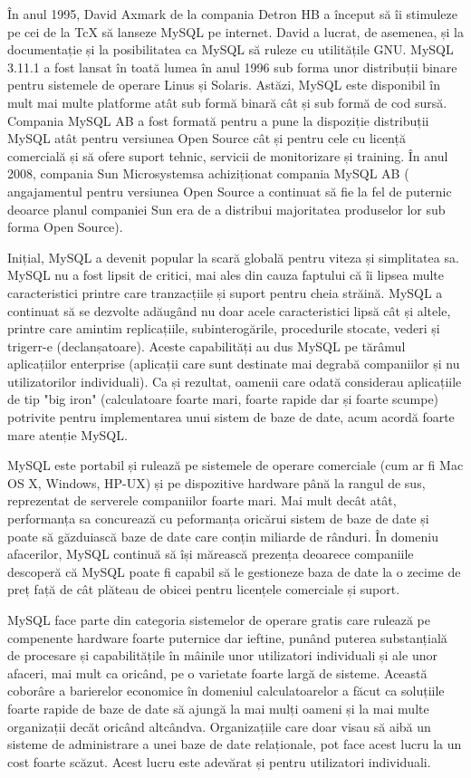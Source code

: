 \documentclass[12pt]{book}
\begin{document}
În anul 1995, David Axmark de la compania Detron HB a început să îi stimuleze pe cei de la TcX să lanseze MySQL pe internet. David a lucrat, de asemenea, și la documentație și la posibilitatea ca MySQL să ruleze cu utilitățile GNU. MySQL 3.11.1 a fost lansat în toată lumea în anul 1996 sub forma unor distribuții binare pentru sistemele de operare Linus și Solaris. Astăzi, MySQL este disponibil în mult mai multe platforme atât sub formă binară cât și sub formă de cod sursă. Compania MySQL AB a fost formată pentru a pune la dispoziție distribuții MySQL atât pentru versiunea Open Source cât și pentru cele cu licență comercială și să ofere suport tehnic, servicii de monitorizare și training. În anul 2008, compania Sun Microsystemsa achiziționat compania MySQL AB ( angajamentul pentru versiunea Open Source a continuat să fie la fel de puternic deoarce planul companiei Sun era de a distribui majoritatea produselor lor sub forma Open Source).

Inițial, MySQL a devenit popular la scară globală pentru viteza și simplitatea sa. MySQL nu a fost lipsit de critici, mai ales din cauza faptului că îi lipsea multe caracteristici printre care tranzacțiile și suport pentru cheia străină. MySQL a continuat să se dezvolte adăugând nu doar acele caracteristici lipsă cât și altele, printre care amintim replicațiile, subinterogările, procedurile stocate, vederi și trigerr-e (declanșatoare). Aceste capabilități au dus MySQL pe tărâmul aplicațiilor enterprise (aplicații care sunt destinate mai degrabă companiilor și nu utilizatorilor individuali). Ca și rezultat, oamenii care odată considerau aplicațiile de tip "big iron" (calculatoare foarte mari, foarte rapide dar și foarte scumpe) potrivite pentru implementarea unui sistem de baze de date, acum acordă foarte mare atenție MySQL. 

MySQL este portabil și rulează pe sistemele de operare comerciale (cum ar fi Mac OS X, Windows, HP-UX) și pe dispozitive hardware până la rangul de sus, reprezentat de serverele companiilor foarte mari. Mai mult decât atât, performanța sa concurează cu peformanța oricărui sistem de baze de date și poate să găzduiască baze de date care conțin miliarde de rânduri. În domeniu afacerilor, MySQL continuă să își mărească prezența deoarece companiile descoperă că MySQL poate fi capabil să le gestioneze baza de date la o zecime de preț față de cât plăteau de obicei pentru licențele comerciale și suport.

MySQL face parte din categoria sistemelor de operare gratis care rulează pe compenente hardware foarte puternice dar ieftine, punând puterea substanțială de procesare și capabilitățile în mâinile unor utilizatori individuali și ale unor afaceri, mai mult ca oricând, pe o varietate foarte largă de sisteme. Această coborâre a barierelor economice în domeniul calculatoarelor a făcut ca soluțiile foarte rapide de baze de date să ajungă la mai mulți oameni și la mai multe organizații decăt oricând altcândva. Organizațiile care doar visau să aibă un sisteme de administrare a unei baze de date relaționale, pot face acest lucru la un cost foarte scăzut. Acest lucru este adevărat și pentru utilizatori individuali.
\end{document}
